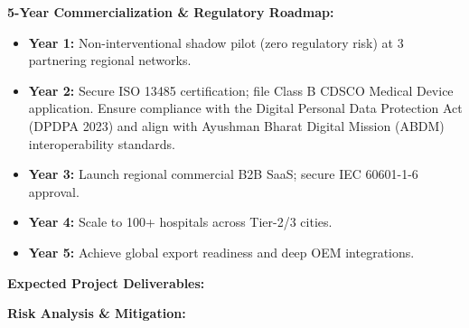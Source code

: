 \documentclass[11pt, a4paper]{article}
\begin{document}
\vspace{0.2cm}
\textbf{5-Year Commercialization \& Regulatory Roadmap:}
\begin{itemize}
    \item \textbf{Year 1:} Non-interventional shadow pilot (zero regulatory risk) at 3 partnering regional networks.
    \item \textbf{Year 2:} Secure ISO 13485 certification; file Class B CDSCO Medical Device application. Ensure compliance with the Digital Personal Data Protection Act (DPDPA 2023) and align with Ayushman Bharat Digital Mission (ABDM) interoperability standards.
    \item \textbf{Year 3:} Launch regional commercial B2B SaaS; secure IEC 60601-1-6 approval.
    \item \textbf{Year 4:} Scale to 100+ hospitals across Tier-2/3 cities.
    \item \textbf{Year 5:} Achieve global export readiness and deep OEM integrations.
\end{itemize}

\vspace{0.2cm}
\textbf{Expected Project Deliverables:}\\

\vspace{0.4cm}
\textbf{Risk Analysis \& Mitigation:}
\end{document}
